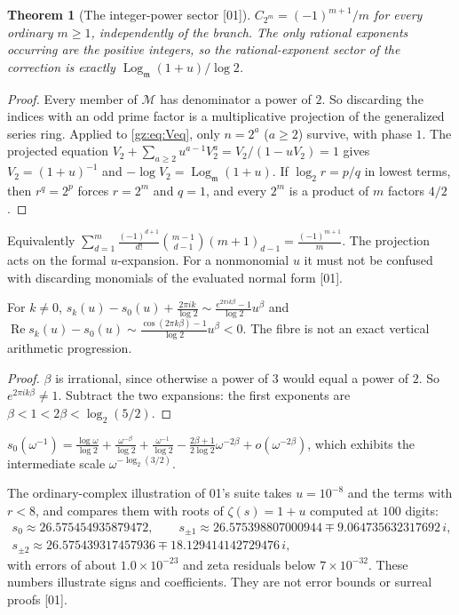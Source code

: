 \documentclass[11pt,a4paper]{article}
\numberwithin{equation}{section}
\newtheorem{theorem}{Theorem}[section]
\theoremstyle{definition}
\theoremstyle{remark}
\newcommand{\mm}{\mathfrak m}
\renewcommand{\Re}{\operatorname{Re}}
\newcommand{\Lgm}{\operatorname{Log}_{\mm}}
\newcommand{\src}[1]{\textup{[#1]}}
\begin{document}
\begin{theorem}[The integer-power sector \src{01}]\label{gz:thm:integersector}
$C_{2^m}=(-1)^{m+1}/m$ for every ordinary $m\ge1$, independently of the
branch. The only rational exponents occurring are the positive integers, so
the rational-exponent sector of the correction is exactly
$\Lgm(1+u)/\log2$.
\end{theorem}
\begin{proof}
Every member of $\mathcal M$ has denominator a power of $2$. So discarding
the indices with an odd prime factor is a multiplicative projection of the
generalized series ring. Applied to \eqref{gz:eq:Veq}, only $n=2^a$
($a\ge2$) survive, with phase $1$. The projected equation
$V_2+\sum_{a\ge2}u^{a-1}V_2^a=V_2/(1-uV_2)=1$ gives $V_2=(1+u)^{-1}$ and
$-\log V_2=\Lgm(1+u)$. If $\log_2r=p/q$ in lowest terms, then $r^q=2^p$
forces $r=2^m$ and $q=1$, and every $2^m$ is a product of $m$ factors
$4/2$.
\end{proof}
Equivalently $\sum_{d=1}^m\frac{(-1)^{d+1}}{d!}\binom{m-1}{d-1}(m+1)_{d-1}=\frac{(-1)^{m+1}}m$.
The projection acts on the formal $u$-expansion. For a nonmonomial $u$ it
must not be confused with discarding monomials of the evaluated normal form
\src{01}.

\begin{corollary}[The real branch is rightmost \src{01}]\label{gz:cor:rightmost}
For $k\ne0$,
$s_k(u)-s_0(u)+\frac{2\pi ik}{\log2}\sim\frac{e^{2\pi ik\beta}-1}{\log2}u^\beta$ and
$\Re s_k(u)-s_0(u)\sim\frac{\cos(2\pi k\beta)-1}{\log2}u^\beta<0$. The fibre is
not an exact vertical arithmetic progression.
\end{corollary}
\begin{proof}
$\beta$ is irrational, since otherwise a power of $3$ would equal a power of
$2$. So $e^{2\pi ik\beta}\ne1$. Subtract the two expansions: the first
exponents are $\beta<1<2\beta<\log_2(5/2)$.
\end{proof}
\begin{example}[\src{01}]
$s_0(\omega^{-1})=\frac{\log\omega}{\log2}+\frac{\omega^{-\beta}}{\log2}+\frac{\omega^{-1}}{\log2}-\frac{2\beta+1}{2\log2}\omega^{-2\beta}+o(\omega^{-2\beta})$,
which exhibits the intermediate scale $\omega^{-\log_2(3/2)}$.
\end{example}
The ordinary-complex illustration of 01's suite takes $u=10^{-8}$ and the
terms with $r<8$, and compares them with roots of $\zeta(s)=1+u$ computed
at $100$ digits:
\begin{gather*}
s_0\approx26.575454935879472,\qquad
s_{\pm1}\approx26.575398807000944\mp9.064735632317692\,i,\\
s_{\pm2}\approx26.575439317457936\mp18.129414142729476\,i,
\end{gather*}
with errors of about $1.0\times10^{-23}$ and zeta residuals below
$7\times10^{-32}$. These numbers illustrate signs and coefficients. They are
not error bounds or surreal proofs \src{01}.
\end{document}
